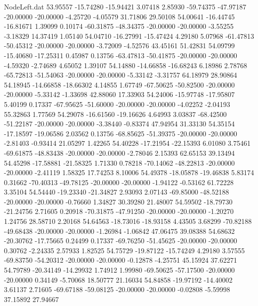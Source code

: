 \begin{filecontents}{NodeLeft.dat}
  53.95557  -15.74280  -15.94421     3.07418    2.85930  -59.74375  -47.97187  -20.00000  -20.00000   -4.25720   -4.05579   31.71806   29.50108
  54.00641  -16.44745  -16.81671     1.39099    0.10174  -60.31875  -48.34375  -20.00000  -20.00000   -3.55255   -3.18329   14.37419    1.05140
  54.04710  -16.27991  -15.47424     4.29180    5.07968  -61.47813  -50.45312  -20.00000  -20.00000   -3.72009   -4.52576   43.45161   51.42831
  54.09799  -15.40680  -17.25311     0.45987    0.13756  -63.47813  -50.41875  -20.00000  -20.00000   -4.59320   -2.74689    4.65052    1.39107
  54.14880  -14.66858  -16.68243     6.18986    2.78768  -65.72813  -51.54063  -20.00000  -20.00000   -5.33142   -3.31757   64.18979   28.90864
  54.18945  -14.66858  -18.66302     4.14855    1.67749  -67.50625  -50.82500  -20.00000  -20.00000   -5.33142   -1.33698   42.88060   17.33903
  54.24006  -15.97748  -17.95807     5.40199    0.17337  -67.95625  -51.60000  -20.00000  -20.00000   -4.02252   -2.04193   55.32863    1.77569
  54.29078  -16.61560  -19.16626     4.64993    3.03837  -68.42500  -51.22187  -20.00000  -20.00000   -3.38440   -0.83374   47.94954   31.33130
  54.35154  -17.18597  -19.06586     2.03562    0.13756  -68.85625  -51.39375  -20.00000  -20.00000   -2.81403   -0.93414   21.05297    1.42265
  54.40228  -17.21954  -22.15393     6.01080    3.75461  -69.61875  -48.83438  -20.00000  -20.00000   -2.78046    2.15393   62.65153   39.13494
  54.45298  -17.58881  -21.58325     1.71330    0.78218  -70.14062  -48.22813  -20.00000  -20.00000   -2.41119    1.58325   17.74253    8.10006
  54.49378  -18.05878  -19.46838     5.83174    0.31662  -70.40313  -49.78125  -20.00000  -20.00000   -1.94122   -0.53162   61.72228    3.35104
  54.54440  -19.23340  -21.34827     2.93093    2.07143  -69.85000  -48.52188  -20.00000  -20.00000   -0.76660    1.34827   30.39280   21.48007
  54.59502  -18.79730  -21.24756     2.71605    0.20918  -70.31875  -47.91250  -20.00000  -20.00000   -1.20270    1.24756   28.58710    2.20168
  54.64563  -18.73016  -18.93158     4.43505    3.68299  -70.82188  -49.68438  -20.00000  -20.00000   -1.26984   -1.06842   47.06475   39.08388
  54.68632  -20.30762  -17.75665     0.24499    0.17337  -69.76250  -51.45625  -20.00000  -20.00000    0.30762   -2.24335    2.57933    1.82525
  54.75729  -19.87122  -15.74249     4.29180    3.57555  -69.83750  -54.20312  -20.00000  -20.00000   -0.12878   -4.25751   45.15924   37.62271
  54.79789  -20.34149  -14.29932     1.74912    1.99980  -69.50625  -57.17500  -20.00000  -20.00000    0.34149   -5.70068   18.50777   21.16034
  54.84858  -19.97192  -14.40002     3.61137    2.71605  -69.67188  -59.08125  -20.00000  -20.00000   -0.02808   -5.59998   37.15892   27.94667

\end{filecontents}

